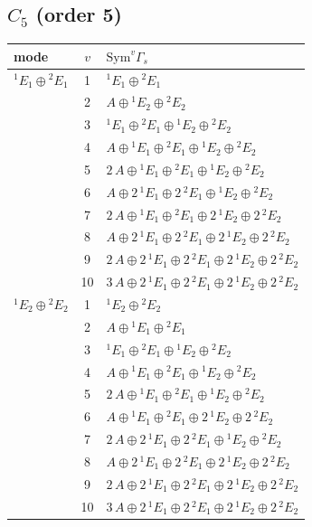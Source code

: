 \documentclass[11pt]{article}
\begin{document}
\subsection*{$C_{5}$ \quad (order 5)}
\begin{longtable}{l c p{}}
\hline mode & $v$ & $\mathrm{Sym}^v\Gamma_s$\\ \hline\endhead
${}^{1}E_{1}\oplus {}^{2}E_{1}$ & 1 & ${}^{1}E_{1}\oplus {}^{2}E_{1}$\\
 & 2 & $A\oplus {}^{1}E_{2}\oplus {}^{2}E_{2}$\\
 & 3 & ${}^{1}E_{1}\oplus {}^{2}E_{1}\oplus {}^{1}E_{2}\oplus {}^{2}E_{2}$\\
 & 4 & $A\oplus {}^{1}E_{1}\oplus {}^{2}E_{1}\oplus {}^{1}E_{2}\oplus {}^{2}E_{2}$\\
 & 5 & $2\,A\oplus {}^{1}E_{1}\oplus {}^{2}E_{1}\oplus {}^{1}E_{2}\oplus {}^{2}E_{2}$\\
 & 6 & $A\oplus 2\,{}^{1}E_{1}\oplus 2\,{}^{2}E_{1}\oplus {}^{1}E_{2}\oplus {}^{2}E_{2}$\\
 & 7 & $2\,A\oplus {}^{1}E_{1}\oplus {}^{2}E_{1}\oplus 2\,{}^{1}E_{2}\oplus 2\,{}^{2}E_{2}$\\
 & 8 & $A\oplus 2\,{}^{1}E_{1}\oplus 2\,{}^{2}E_{1}\oplus 2\,{}^{1}E_{2}\oplus 2\,{}^{2}E_{2}$\\
 & 9 & $2\,A\oplus 2\,{}^{1}E_{1}\oplus 2\,{}^{2}E_{1}\oplus 2\,{}^{1}E_{2}\oplus 2\,{}^{2}E_{2}$\\
 & 10 & $3\,A\oplus 2\,{}^{1}E_{1}\oplus 2\,{}^{2}E_{1}\oplus 2\,{}^{1}E_{2}\oplus 2\,{}^{2}E_{2}$\\
\hline
${}^{1}E_{2}\oplus {}^{2}E_{2}$ & 1 & ${}^{1}E_{2}\oplus {}^{2}E_{2}$\\
 & 2 & $A\oplus {}^{1}E_{1}\oplus {}^{2}E_{1}$\\
 & 3 & ${}^{1}E_{1}\oplus {}^{2}E_{1}\oplus {}^{1}E_{2}\oplus {}^{2}E_{2}$\\
 & 4 & $A\oplus {}^{1}E_{1}\oplus {}^{2}E_{1}\oplus {}^{1}E_{2}\oplus {}^{2}E_{2}$\\
 & 5 & $2\,A\oplus {}^{1}E_{1}\oplus {}^{2}E_{1}\oplus {}^{1}E_{2}\oplus {}^{2}E_{2}$\\
 & 6 & $A\oplus {}^{1}E_{1}\oplus {}^{2}E_{1}\oplus 2\,{}^{1}E_{2}\oplus 2\,{}^{2}E_{2}$\\
 & 7 & $2\,A\oplus 2\,{}^{1}E_{1}\oplus 2\,{}^{2}E_{1}\oplus {}^{1}E_{2}\oplus {}^{2}E_{2}$\\
 & 8 & $A\oplus 2\,{}^{1}E_{1}\oplus 2\,{}^{2}E_{1}\oplus 2\,{}^{1}E_{2}\oplus 2\,{}^{2}E_{2}$\\
 & 9 & $2\,A\oplus 2\,{}^{1}E_{1}\oplus 2\,{}^{2}E_{1}\oplus 2\,{}^{1}E_{2}\oplus 2\,{}^{2}E_{2}$\\
 & 10 & $3\,A\oplus 2\,{}^{1}E_{1}\oplus 2\,{}^{2}E_{1}\oplus 2\,{}^{1}E_{2}\oplus 2\,{}^{2}E_{2}$\\
\hline
\end{longtable}
\end{document}
